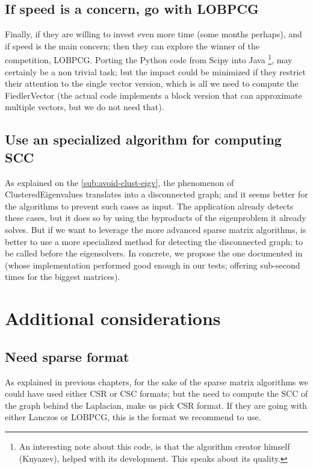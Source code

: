 \subsection{If speed is a concern, go with \gls{LOBPCG}}

Finally, if they are willing to invest even more time (some months
perhaps),  and if speed is the
main concern; then they can explore the winner of the competition,
\gls{LOBPCG}. Porting the Python code from Scipy into Java \footnote{An
  interesting note about this code, is that the algorithm creator
  himself (Knyazev), helped with its development. This speaks about
  its quality.}, may certainly be a non trivial task; but the impact
could be minimized if they restrict their attention to the single
vector version, which is all we need to compute the \gls{FiedlerVector} (the
actual code implements a block version that can approximate multiple
vectors, but we do not need that).

\subsection{Use an specialized algorithm for computing SCC}

As explained on the \cref{sub:avoid-clust-eigv}, the phenomenon of
\gls{ClusteredEigenvalues} translates into a disconnected graph; and
it seems better for the algorithms to prevent such cases as input. The
application already detects these cases, but it does so by using the
byproducts of the eigenproblem it already solves. But if we want to
leverage the more advanced sparse matrix algorithms, is better to use
a more specialized method for detecting the disconnected graph; to
be called before the eigensolvers. In
concrete, we propose the one documented in \cite{pearce05} (whose
implementation performed good enough in our tests; offering sub-second
times for the biggest matrices). 

\section{Additional considerations}

\subsection{Need sparse format}

As explained in previous chapters, for the sake of the sparse matrix
algorithms we 
could have used either CSR or CSC formats; but the need to compute the
\gls{SCC} of the graph behind the \gls{Laplacian}, make us pick CSR
format. If they are going with either Lanczos or \gls{LOBPCG}, this is the
format we recommend to use. \\

